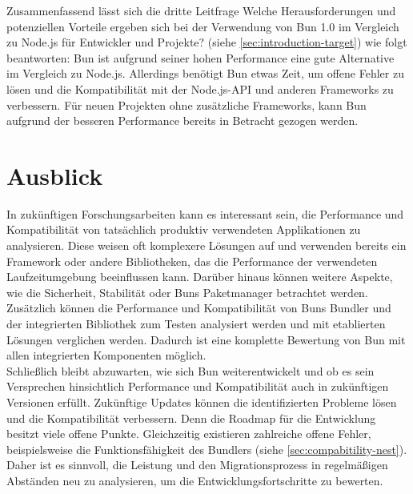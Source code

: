 \noindent
Zusammenfassend lässt sich die dritte Leitfrage \glqq Welche Herausforderungen und potenziellen Vorteile ergeben sich bei der Verwendung von Bun 1.0 im Vergleich zu Node.js für Entwickler und Projekte?\grqq{} (siehe \autoref{sec:introduction-target}) wie folgt beantworten: Bun ist aufgrund seiner hohen Performance eine gute Alternative im Vergleich zu Node.js. Allerdings benötigt Bun etwas Zeit, um offene Fehler zu lösen und die Kompatibilität mit der Node.js-API und anderen Frameworks zu verbessern. Für neuen Projekten ohne zusätzliche Frameworks, kann Bun aufgrund der besseren Performance bereits in Betracht gezogen werden.


\section{Ausblick} \label{sec:finalThoughts-outlook}
In zukünftigen Forschungsarbeiten kann es interessant sein, die Performance und Kompatibilität von tatsächlich produktiv verwendeten Applikationen zu analysieren. Diese weisen oft komplexere Lösungen auf und verwenden bereits ein Framework oder andere Bibliotheken, das die Performance der verwendeten Laufzeitumgebung beeinflussen kann. Darüber hinaus können weitere Aspekte, wie die Sicherheit, Stabilität oder Buns Paketmanager betrachtet werden. Zusätzlich können die Performance und Kompatibilität von Buns Bundler und der integrierten Bibliothek zum Testen analysiert werden und mit etablierten Lösungen verglichen werden. Dadurch ist eine komplette Bewertung von Bun mit allen integrierten Komponenten möglich.\\

\noindent
Schließlich bleibt abzuwarten, wie sich Bun weiterentwickelt und ob es sein Versprechen hinsichtlich Performance und Kompatibilität auch in zukünftigen Versionen erfüllt. Zukünftige Updates können die identifizierten Probleme lösen und die Kompatibilität verbessern. Denn die Roadmap für die Entwicklung besitzt viele offene Punkte. Gleichzeitig existieren zahlreiche offene Fehler, beispielsweise die Funktionsfähigkeit des Bundlers (siehe \autoref{sec:compabitility-nest}). Daher ist es sinnvoll, die Leistung und den Migrationsprozess in regelmäßigen Abständen neu zu analysieren, um die Entwicklungsfortschritte zu bewerten.
